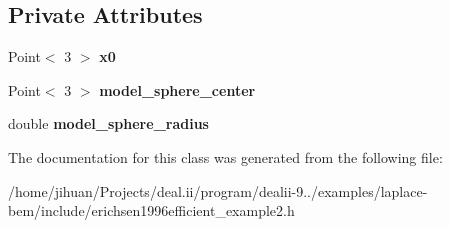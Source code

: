 \subsection*{Private Attributes}
\begin{DoxyCompactItemize}
\item 
\mbox{\label{classLaplaceBEM_1_1Erichsen1996Efficient_1_1Example2_1_1NeumannBC_a3d5d3c953fa5e212eef7acdc0fface73}} 
Point$<$ 3 $>$ {\bfseries x0}
\item 
\mbox{\label{classLaplaceBEM_1_1Erichsen1996Efficient_1_1Example2_1_1NeumannBC_a58da53269bae22bf7fe25d5c8bf8add3}} 
Point$<$ 3 $>$ {\bfseries model\+\_\+sphere\+\_\+center}
\item 
\mbox{\label{classLaplaceBEM_1_1Erichsen1996Efficient_1_1Example2_1_1NeumannBC_a1d7bec12c397d5b5255f3eba2a0d83c7}} 
double {\bfseries model\+\_\+sphere\+\_\+radius}
\end{DoxyCompactItemize}


The documentation for this class was generated from the following file\+:\begin{DoxyCompactItemize}
\item 
/home/jihuan/\+Projects/deal.\+ii/program/dealii-\/9../examples/laplace-\/bem/include/erichsen1996efficient\+\_\+example2.\+h\end{DoxyCompactItemize}

